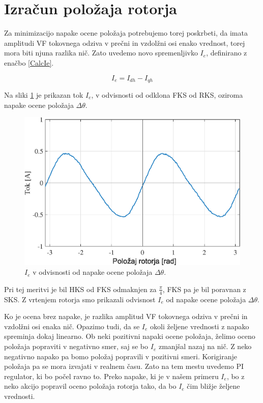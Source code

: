 \documentclass[a4paper,twoside,openright,12pt,slovene]{book}
\begin{document}
\newpage
\section{Izračun položaja rotorja}

Za minimizacijo napake ocene položaja potrebujemo torej poskrbeti, da imata amplitudi VF tokovnega odziva v prečni in vzdolžni osi enako vrednost, torej mora biti njuna razlika nič. Zato uvedemo novo
spremenljivko $I_e$, definirano z enačbo \ref{CalcIe}.

\begin{equation} \label{CalcIe}
    I_e = I_{dh} - I_{qh}
\end{equation}

Na sliki \ref{reguliranaVelicinaIdq0} je prikazan tok $I_e$, v odvisnosti od odklona FKS od RKS, oziroma napake ocene položaja $\Delta\theta$. 

\begin{figure}[!htbp]
    \centering
    \includegraphics[width=0.9\columnwidth]{Slike/reguliranaVelicinaIdq0.eps}
    \caption{\label{reguliranaVelicinaIdq0} $I_e$ v odvisnosti od napake ocene položaja $\Delta\theta$.}
\end{figure}

Pri tej meritvi je bil HKS od FKS odmaknjen za $\frac{\pi}{4}$, FKS pa je bil poravnan z SKS. Z vrtenjem rotorja smo prikazali odvisnost $I_e$ od napake ocene položaja $\Delta\theta$. 

Ko je ocena brez napake, je razlika amplitud VF tokovnega odziva v prečni in vzdolžni osi enaka nič. Opazimo tudi, da se $I_e$ okoli željene vrednosti z napako spreminja dokaj linearno. Ob neki
pozitivni napaki ocene položaja, želimo oceno položaja popraviti v negativno smer, saj se bo $I_e$ zmanjšal nazaj na nič. Z neko negativno napako pa bomo položaj popravili v pozitivni smeri.
Korigiranje položaja pa se mora izvajati v realnem času. Zato na tem mestu uvedemo PI regulator, ki bo počel ravno to. Preko napake, ki je v našem primeru $I_e$, bo z neko akcijo popravil oceno
položaja rotorja tako, da bo $I_e$ čim bližje željene vrednosti.
\end{document}
